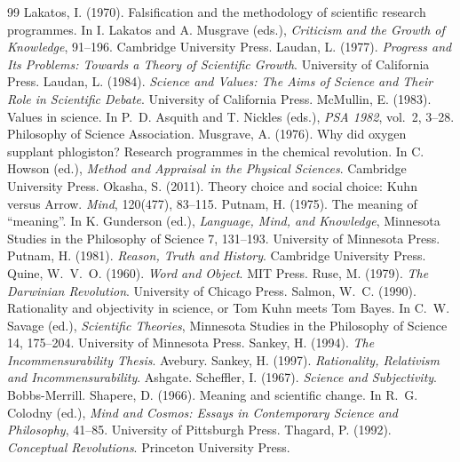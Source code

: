 \documentclass{situationist-preprint}
\begin{document}
\begin{thebibliography}{99}
 Lakatos, I. (1970). Falsification and the methodology of scientific research programmes. In I. Lakatos and A. Musgrave (eds.), \emph{Criticism and the Growth of Knowledge}, 91--196. Cambridge University Press.
 Laudan, L. (1977). \emph{Progress and Its Problems: Towards a Theory of Scientific Growth}. University of California Press.
 Laudan, L. (1984). \emph{Science and Values: The Aims of Science and Their Role in Scientific Debate}. University of California Press.
 McMullin, E. (1983). Values in science. In P.~D. Asquith and T. Nickles (eds.), \emph{PSA 1982}, vol.~2, 3--28. Philosophy of Science Association.
 Musgrave, A. (1976). Why did oxygen supplant phlogiston? Research programmes in the chemical revolution. In C. Howson (ed.), \emph{Method and Appraisal in the Physical Sciences}. Cambridge University Press.
 Okasha, S. (2011). Theory choice and social choice: Kuhn versus Arrow. \emph{Mind}, 120(477), 83--115.
 Putnam, H. (1975). The meaning of \enquote{meaning}. In K. Gunderson (ed.), \emph{Language, Mind, and Knowledge}, Minnesota Studies in the Philosophy of Science 7, 131--193. University of Minnesota Press.
 Putnam, H. (1981). \emph{Reason, Truth and History}. Cambridge University Press.
 Quine, W.~V.~O. (1960). \emph{Word and Object}. MIT Press.
 Ruse, M. (1979). \emph{The Darwinian Revolution}. University of Chicago Press.
 Salmon, W.~C. (1990). Rationality and objectivity in science, or Tom Kuhn meets Tom Bayes. In C.~W. Savage (ed.), \emph{Scientific Theories}, Minnesota Studies in the Philosophy of Science 14, 175--204. University of Minnesota Press.
 Sankey, H. (1994). \emph{The Incommensurability Thesis}. Avebury.
 Sankey, H. (1997). \emph{Rationality, Relativism and Incommensurability}. Ashgate.
 Scheffler, I. (1967). \emph{Science and Subjectivity}. Bobbs-Merrill.
 Shapere, D. (1966). Meaning and scientific change. In R.~G. Colodny (ed.), \emph{Mind and Cosmos: Essays in Contemporary Science and Philosophy}, 41--85. University of Pittsburgh Press.
 Thagard, P. (1992). \emph{Conceptual Revolutions}. Princeton University Press.
\end{thebibliography}
\end{document}
